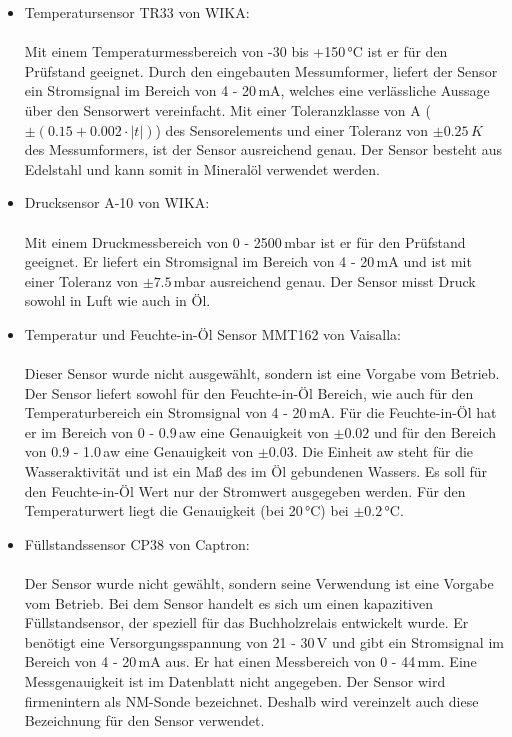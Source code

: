 \begin{itemize}
	\item Temperatursensor TR33 von WIKA:\\
	\\
	Mit einem Temperaturmessbereich von -30 bis +150\,°C ist er für den Prüfstand geeignet. Durch den eingebauten Messumformer, liefert der Sensor ein Stromsignal im Bereich von 4 - 20\,mA, welches eine verlässliche Aussage über den Sensorwert vereinfacht. Mit einer Toleranzklasse von A (\(\pm(0.15 + 0.002 \cdot |t|)\)) des Sensorelements und einer Toleranz von \(\pm 0.25\,K\) des Messumformers, ist der Sensor ausreichend genau. Der Sensor besteht aus Edelstahl und kann somit in Mineralöl verwendet werden.
	\cite{TR33_datasheet}
	
	\item Drucksensor A-10 von WIKA:\\
	\\
	Mit einem Druckmessbereich von 0 - 2500\,mbar ist er für den Prüfstand geeignet. Er liefert ein Stromsignal im Bereich von 4 - 20\,mA und ist mit einer Toleranz von \(\pm 7.5\)\,mbar ausreichend genau. Der Sensor misst Druck sowohl in Luft wie auch in Öl.
	\cite{A-10_datasheet}
	
	\item Temperatur und Feuchte-in-Öl Sensor MMT162 von Vaisalla:\\
	\\
	Dieser Sensor wurde nicht ausgewählt, sondern ist eine Vorgabe vom Betrieb. Der Sensor liefert sowohl für den Feuchte-in-Öl Bereich, wie auch für den Temperaturbereich ein Stromsignal von 4 - 20\,mA. Für die Feuchte-in-Öl hat er im Bereich von 0 - 0.9\,aw eine Genauigkeit von \(\pm 0.02\) und für den Bereich von 0.9 - 1.0\,aw eine Genauigkeit von \(\pm 0.03\). Die Einheit aw steht für die Wasseraktivität und ist ein Maß des im Öl gebundenen Wassers. Es soll für den Feuchte-in-Öl Wert nur der Stromwert ausgegeben werden. Für den Temperaturwert liegt die Genauigkeit (bei 20\,°C) bei \(\pm 0.2\)\,°C.
	\cite{MMT162_datasheet}
	
	\item Füllstandssensor CP38 von Captron:\\
	\\
	Der Sensor wurde nicht gewählt, sondern seine Verwendung ist eine Vorgabe vom Betrieb. Bei dem Sensor handelt es sich um einen kapazitiven Füllstandsensor, der speziell für das Buchholzrelais entwickelt wurde. Er benötigt eine Versorgungsspannung von 21 - 30\,V und gibt ein Stromsignal im Bereich von 4 - 20\,mA aus. Er hat einen Messbereich von 0 - 44\,mm. Eine Messgenauigkeit ist im Datenblatt nicht angegeben. Der Sensor wird firmenintern als NM-Sonde bezeichnet. Deshalb wird vereinzelt auch diese Bezeichnung für den Sensor verwendet.
	\cite{CP38_datasheet}
	

\end{itemize}
